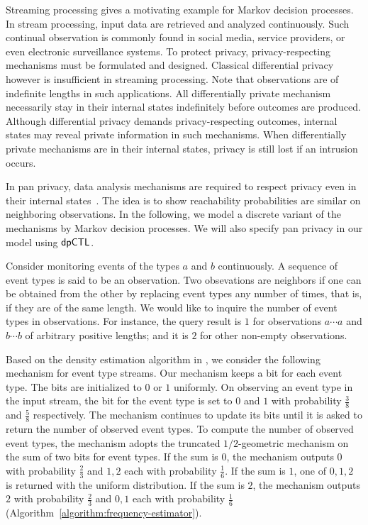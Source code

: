 
Streaming processing gives a motivating example for Markov
decision processes. In stream processing, input data are retrieved and
analyzed continuously. Such continual observation is commonly found
in social media, service providers, or even electronic surveillance
systems. To protect privacy, privacy-respecting mechanisms must be
formulated and designed. Classical differential privacy however is
insufficient in streaming processing. Note that observations are of
indefinite lengths in such applications. All differentially private
mechanism necessarily stay in their internal states indefinitely
before outcomes are produced. Although differential privacy demands
privacy-respecting outcomes, internal states may reveal private
information in such mechanisms. When differentially private mechanisms
are in their internal states, privacy is still lost if an intrusion
occurs.

In pan privacy, data analysis mechanisms are required to respect
privacy even in their internal states~\cite{DNPR:10:DPCO,DNPRY:10:PPSA}.
The idea is to show reachability probabilities are similar on
neighboring observations. In the following, we model a discrete
variant of the mechanisms by Markov decision processes. We will also
specify pan privacy in our model using $\textsf{dpCTL}$.

Consider monitoring events of the types $a$ and $b$ continuously.
A sequence of event types is said to be an observation. Two
obsevations are {neighbors} if one can be obtained from the other
by replacing event types any number of times, that is, if they are of
the same length. %
We would like to inquire the number of event types in
observations. For instance, the query result is $1$
for observations $a \cdots a$ and $b \cdots b$ of arbitrary positive
lengths; and it is $2$ for other non-empty observations.

Based on the density estimation algorithm in \cite{DNPRY:10:PPSA}, we
consider the following mechanism for event type streams. Our mechanism
keeps a bit for each event type. The bits are initialized to $0$ or
$1$ uniformly. On observing an event type in the input stream, the
bit for the event type is set to $0$ and $1$ with probability
$\frac{3}{8}$ and $\frac{5}{8}$ respectively. The mechanism continues
to update its bits until it is asked to return the number of observed
event types. To compute the number of observed event types, the
mechanism adopts the truncated $1/2$-geometric mechanism on the sum of
two bits for event types. If the sum is $0$, the mechanism outputs $0$
with probability $\frac{2}{3}$ and $1, 2$ each with probability
$\frac{1}{6}$. If the sum is $1$, one of $0, 1, 2$ is returned with
the uniform distribution. If the sum is $2$, the mechanism outputs $2$
with probability $\frac{2}{3}$ and $0, 1$ each with probability
$\frac{1}{6}$ (Algorithm~\ref{algorithm:frequency-estimator}).

